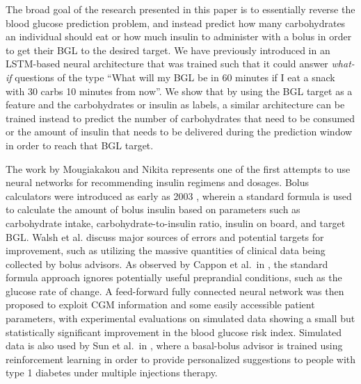 \documentclass{ecai}
\begin{document}
The broad goal of the research presented in this paper is to essentially reverse the blood glucose prediction problem, and instead predict how many carbohydrates an individual should eat or how much insulin to administer with a bolus in order to get their BGL to the desired target. We have previously introduced in \cite{mirshekarian:embc19} an LSTM-based neural architecture that was trained such that it could answer {\it what-if} questions of the type “What will my BGL be in 60 minutes if I eat a snack with 30 carbs 10 minutes from now”. We show that by using the BGL target as a feature and the carbohydrates or insulin as labels, a similar architecture can be trained instead to predict the number of carbohydrates that need to be consumed or the amount of insulin that needs to be delivered during the prediction window in order to reach that BGL target.

The work by Mougiakakou and Nikita \cite{stavroula:dtt} represents one of the first attempts to use neural networks for recommending insulin regimens and dosages. Bolus calculators were introduced as early as 2003 \cite{zisser:dtt08}, wherein a standard formula is used to calculate the amount of bolus insulin based on parameters such as carbohydrate intake, carbohydrate-to-insulin ratio, insulin on board, and target BGL. Walsh et al. \cite{walsh:jdst18} discuss major sources of errors and potential targets for improvement, such as utilizing the massive quantities of clinical data being collected by bolus advisors. As observed by Cappon et al.~in \cite{cappon:jdst18}, the standard formula approach ignores potentially useful preprandial conditions, such as the glucose rate of change. A feed-forward fully connected neural network was then proposed to exploit CGM information and some easily accessible patient parameters, with experimental evaluations on simulated data showing a small but statistically significant improvement in the blood glucose risk index. Simulated data is also used by Sun et al.~in \cite{sun:jbhi19}, where a basal-bolus advisor is trained using reinforcement learning in order to provide personalized suggestions to people with type 1 diabetes under multiple injections therapy.
\end{document}
